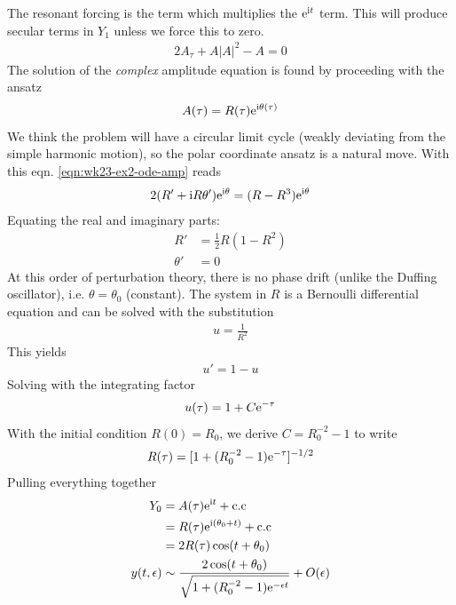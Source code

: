 The resonant forcing is the term which multiplies the $\mathrm{e}^{\mathrm{i} t}$ term. This will produce secular terms in $Y_1$ unless we force this to zero.
\begin{gather}
	2 A_\tau + A |A|^2 - A = 0 \label{eqn:wk23-ex2-ode-amp}
\end{gather}
The solution of the \emph{complex} amplitude equation is found by proceeding with the ansatz
\begin{gather}
	A(\tau) = R(\tau) \mathrm{e}^{\mathrm{i} \theta(\tau )} \label{eqn:wk23-evelope-ansatz}
\end{gather}
We think the problem will have a circular limit cycle (weakly deviating from the simple harmonic motion), so the polar coordinate ansatz is a natural move. With this eqn. \ref{eqn:wk23-ex2-ode-amp} reads
\begin{gather*}
	2 (R' + \mathrm{i} R \theta') \mathrm{e}^{\mathrm{i} \theta} = (R - R^3)\mathrm{e}^{\mathrm{i} \theta}
\end{gather*}
Equating the real and imaginary parts:
\begin{align*}
	R' &= \frac{1}{2} R(1-R^2) \\
	\theta ' &= 0
\end{align*}
At this order of perturbation theory, there is no phase drift (unlike the Duffing oscillator), i.e. $\theta = \theta_0$ (constant). The system in $R$ is a Bernoulli differential equation and can be solved with the substitution  
\begin{gather*}
	u = \frac{1}{R^2}
\end{gather*}
This yields
\begin{gather*}
	u' = 1 - u
\end{gather*}
Solving with the integrating factor
\begin{gather*}
	u(\tau) = 1 + C\mathrm{e}^{-\tau}
\end{gather*}
With the initial condition $R(0)= R_0$, we derive $C = R_0^{-2}-1$ to write
\begin{gather*}
	R(\tau ) = [1+(R_0^{-2}-1)\mathrm{e}^{-\tau}]^{-1/2}
\end{gather*}
Pulling everything together
\begin{align}
	Y_0 &= A(\tau) \mathrm{e}^{\mathrm{i} t} + \text{c.c} \nonumber \\
	&= R(\tau) \mathrm{e}^{\mathrm{i} (\theta_0 + t)}+ \text{c.c} \nonumber \\
	&= 2 R(\tau) \cos (t+\theta_0) \nonumber \\
	y(t,\epsilon) &\sim \frac{2 \cos (t+\theta_0)}{\sqrt{1+(R_0^{-2}-1)\mathrm{e}^{-\epsilon t}}} + O(\epsilon) \label{eqn:wk23-vdP-ana}
\end{align}
